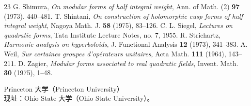 \begin{thebibliography}{23}
 G. Shimura, \emph{On modular forms of half integral weight}, Ann. of Math. (2) \textbf{97} (1973), 440--481.
 T. Shintani, \emph{On construction of holomorphic cusp forms of half integral weight}, Nagoya Math. J. \textbf{58} (1975), 83--126.
 C. L. Siegel, \emph{Lectures on quadratic forms}, Tata Institute Lecture Notes, no. 7, 1955.
 R. Strichartz, \emph{Harmonic analysis on hyperboloids}, J. Functional Analysis \textbf{12} (1973), 341--383.
 A. Weil, \emph{Sur certaines groupes d'opérateurs unitaires}, Acta Math. \textbf{111} (1964), 143--211.
 D. Zagier, \emph{Modular forms associated to real quadratic fields}, Invent. Math. \textbf{30} (1975), 1--48.
\end{thebibliography}
\noindent Princeton 大学（Princeton University）\\
现址：Ohio State 大学（Ohio State University）。
